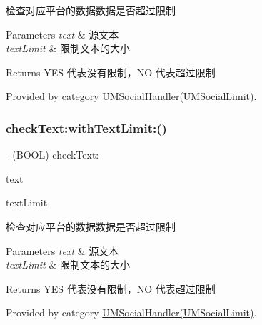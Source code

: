 检查对应平台的数据数据是否超过限制


\begin{DoxyParams}{Parameters}
{\em text} & 源文本 \\
\hline
{\em text\+Limit} & 限制文本的大小\\
\hline
\end{DoxyParams}
\begin{DoxyReturn}{Returns}
Y\+ES 代表没有限制，\+NO 代表超过限制 
\end{DoxyReturn}


Provided by category \mbox{\hyperlink{category_u_m_social_handler_07_u_m_social_limit_08_a50a70e47f3feb853f947b55aebf3dde2}{U\+M\+Social\+Handler(\+U\+M\+Social\+Limit)}}.

\mbox{\label{interface_u_m_social_handler_a50a70e47f3feb853f947b55aebf3dde2}} 
\subsubsection{\texorpdfstring{check\+Text\+:with\+Text\+Limit\+:()}{checkText:withTextLimit:()}\hspace{0.1cm}{\footnotesize\ttfamily [2/2]}}
{\footnotesize\ttfamily -\/ (B\+O\+OL) check\+Text\+: \begin{DoxyParamCaption}\item[{(N\+S\+String $\ast$)}]{text }\item[{withTextLimit:(N\+S\+U\+Integer)}]{text\+Limit }\end{DoxyParamCaption}}

检查对应平台的数据数据是否超过限制


\begin{DoxyParams}{Parameters}
{\em text} & 源文本 \\
\hline
{\em text\+Limit} & 限制文本的大小\\
\hline
\end{DoxyParams}
\begin{DoxyReturn}{Returns}
Y\+ES 代表没有限制，\+NO 代表超过限制 
\end{DoxyReturn}


Provided by category \mbox{\hyperlink{category_u_m_social_handler_07_u_m_social_limit_08_a50a70e47f3feb853f947b55aebf3dde2}{U\+M\+Social\+Handler(\+U\+M\+Social\+Limit)}}.

